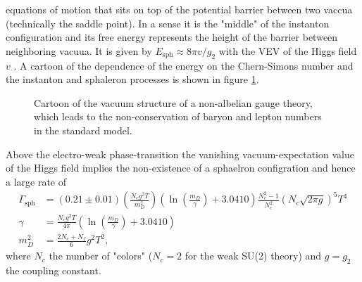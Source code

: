 \documentclass[13pt,a4paper,twoside,titlepage]{article}
\begin{document}
equations of motion that sits on top of the potential barrier between two vaccua (technically the saddle point). In a sense it is the "middle" of the instanton configuration and its free energy represents the height of the barrier between
neighboring vacuua.
It is given by $E_{\mathrm{sph}} \approx 8\pi v / g_2$ with the VEV of the Higgs field $v$ \cite[eq. 4.5]{Cline:2006ts_Baryogenesis}.
A cartoon of the dependence of the energy on the Chern-Simons number and the instanton and sphaleron processes is shown in figure \ref{fig:sphaleron_cartoon}.
\begin{figure}[H]
    \label{fig:sphaleron_cartoon}
    \centering
    \caption{Cartoon of the vacuum structure of a non-albelian gauge theory, which leads to the non-conservation of baryon and lepton numbers in the standard model.
    }
\end{figure}

\noindent
Above the electro-weak phase-transition the vanishing vacuum-expectation value of the Higgs field implies the non-existence of a sphaelron configration and hence a large rate of \cite{sphaleron_rate_symmetric_phase_Moore_2011}
\begin{align}
    \Gamma_{\mathrm{sph}} &= (0.21 \pm 0.01) \left(\frac{N_c g^2 T}{m_D^2} \right) \left(\ln \left(\frac{m_D}{\gamma} \right) + 3.0410 \right) \frac{N_c^2 - 1}{N_c^2} (N_c \sqrt{2 \pi g})^5 T^4 \\
    \gamma &= \frac{N_c g^2 T}{4 \pi} \left(\ln \left(\frac{m_D}{\gamma}\right) + 3.0410 \right) \\
    m_D^2 &= \frac{2N_c + N_f}{6} g^2 T^2,
\end{align}
where $N_c$ the number of "colors" ($N_c = 2$ for the weak SU(2) theory) and $g = g_2$ the coupling constant.
\end{document}
